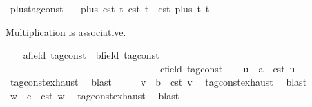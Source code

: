 \begin{isabellebody}
\isanewline
{}\isamarkupfalse%
\ plus{\isacharunderscore}tag{\isacharunderscore}const\isanewline
\ \ \ {\isacartoucheopen}plus\ {\isacharparenleft}{\isasymtau}\isactrlsub c\isactrlsub s\isactrlsub t\ t\ {\isacharparenleft}{\isasymtau}\isactrlsub c\isactrlsub s\isactrlsub t\ t\ {\isacharequal}\ {\isasymtau}\isactrlsub c\isactrlsub s\isactrlsub t\ {\isacharparenleft}plus\ t\ t\isanewline
\isanewline
{}\isamarkupfalse%
%
\isadelimproof
\ %
\endisadelimproof
%
\isatagproof
{}\isamarkupfalse%
%
\begin{isamarkuptext}%
Multiplication is associative.%
\end{isamarkuptext}\isamarkuptrue%
\ \ \isamarkupfalse%
\ a{\isacharcolon}{\isacharcolon}{\isacartoucheopen}{\isacharprime}{\isasymtau}{\isacharcolon}{\isacharcolon}field\ tag{\isacharunderscore}const{\isacartoucheclose}\ \ b{\isacharcolon}{\isacharcolon}{\isacartoucheopen}{\isacharprime}{\isasymtau}{\isacharcolon}{\isacharcolon}field\ tag{\isacharunderscore}const{\isacartoucheclose}\isanewline
\ \ \ \ \ \ \ \ \ \ \ \ \ \ \ \ \ \ \ \ \ \ \ \ \ \ \ \ \ \ \ \ c{\isacharcolon}{\isacharcolon}{\isacartoucheopen}{\isacharprime}{\isasymtau}{\isacharcolon}{\isacharcolon}field\ tag{\isacharunderscore}const{\isacartoucheclose}\isanewline
\ \ \isamarkupfalse%
\ u\ \ {\isacartoucheopen}a\ {\isacharequal}\ {\isasymtau}\isactrlsub c\isactrlsub s\isactrlsub t\ u{\isacartoucheclose}\ \isamarkupfalse%
\ tag{\isacharunderscore}const{\isachardot}exhaust\ \isamarkupfalse%
\ blast\isanewline
\ \ \isamarkupfalse%
\ \isamarkupfalse%
\ v\ \ {\isacartoucheopen}b\ {\isacharequal}\ {\isasymtau}\isactrlsub c\isactrlsub s\isactrlsub t\ v{\isacartoucheclose}\ \isamarkupfalse%
\ tag{\isacharunderscore}const{\isachardot}exhaust\ \isamarkupfalse%
\ blast\isanewline
\ \ \isamarkupfalse%
\ \isamarkupfalse%
\ w\ \ {\isacartoucheopen}c\ {\isacharequal}\ {\isasymtau}\isactrlsub c\isactrlsub s\isactrlsub t\ w{\isacartoucheclose}\ \isamarkupfalse%
\ tag{\isacharunderscore}const{\isachardot}exhaust\ \isamarkupfalse%
\ blast\isanewline
\ \ \isamarkupfalse%

\end{isabellebody}
